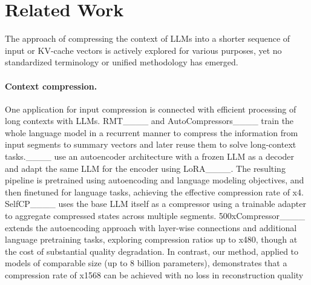 \section{Related Work}



The approach of compressing the context of LLMs into a shorter sequence of input or KV-cache vectors is actively explored for various purposes, yet no standardized terminology or unified methodology has emerged. 
\paragraph{Context compression.} One application for input compression is connected with efficient processing of long contexts with LLMs. RMT____ and AutoCompressors____ train the whole language model in a recurrent manner to compress the information from input segments to summary vectors and later reuse them to solve long-context tasks.____ use an autoencoder architecture with a frozen LLM as a decoder and adapt the same LLM for the encoder using LoRA____. The resulting pipeline is pretrained using autoencoding and language modeling objectives, and then finetuned for language tasks, achieving the effective compression rate of x4. SelfCP____ uses the base LLM itself as a compressor using a trainable adapter to aggregate compressed states across multiple segments. 500xCompressor____ extends the autoencoding approach with layer-wise connections and additional language pretraining tasks, exploring compression ratios up to x480, though at the cost of substantial quality degradation. In contrast, our method, applied to models of comparable size (up to 8 billion parameters), demonstrates that a compression rate of x1568 can be achieved with no loss in reconstruction quality

